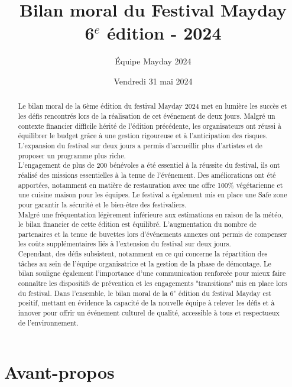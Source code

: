 \documentclass[12pt,a4paper]{report}
\title{Bilan moral du Festival Mayday \\ 6$^e$ édition - 2024}
\author{Équipe Mayday 2024}
\date{Vendredi 31 mai 2024}
\begin{document}
\maketitle

\begin{abstract} %
Le bilan moral de la 6ème édition du festival Mayday 2024 met en lumière les succès et les défis rencontrés lors de la réalisation de cet événement de deux jours. Malgré un contexte financier difficile hérité de l’édition précédente, les organisateurs ont réussi à équilibrer le budget grâce à une gestion rigoureuse et à l’anticipation des risques. L’expansion du festival sur deux jours a permis d’accueillir plus d’artistes et de proposer un programme plus riche.\\

L’engagement de plus de 200 bénévoles a été essentiel à la réussite du festival, ils ont réalisé des missions essentielles à la tenue de l'événement. Des améliorations ont été apportées, notamment en matière de restauration avec une offre 100\% végétarienne et une cuisine maison pour les équipes. Le festival a également mis en place une \og Safe zone \fg{} pour garantir la sécurité et le bien-être des festivaliers.\\

Malgré une fréquentation légèrement inférieure aux estimations en raison de la météo, le bilan financier de cette édition est équilibré. L’augmentation du nombre de partenaires et la tenue de buvettes lors d'événements annexes ont permis de compenser les coûts supplémentaires liés à l’extension du festival sur deux jours.\\

Cependant, des défis subsistent, notamment en ce qui concerne la répartition des tâches au sein de l’équipe organisatrice et la gestion de la phase de démontage. Le bilan souligne également l’importance d’une communication renforcée pour mieux faire connaître les dispositifs de prévention et les engagements "transitions" mis en place lors du festival. Dans l’ensemble, le bilan moral de la 6$^e$ édition du festival Mayday est positif, mettant en évidence la capacité de la nouvelle équipe à relever les défis et à innover pour offrir un événement culturel de qualité, accessible à tous et respectueux de l’environnement.
\end{abstract}

\tableofcontents

\newpage

\section*{Avant-propos}
\end{document}
